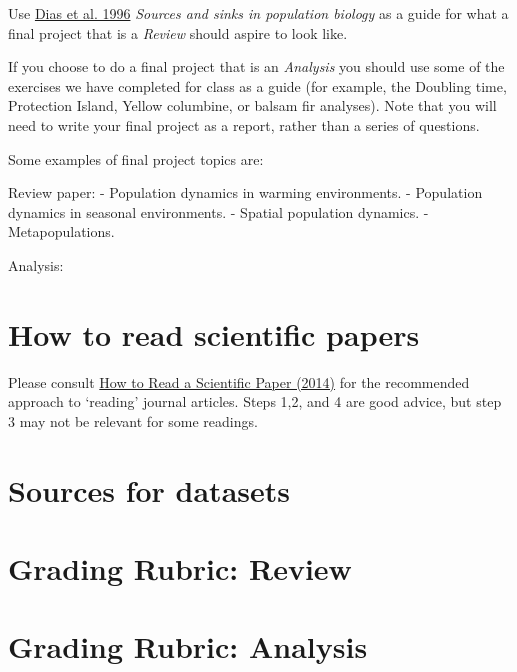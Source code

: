 \documentclass[]{book}
\begin{document}
Use
\href{https://www-sciencedirect-com.qe2a-proxy.mun.ca/science/article/pii/0169534796100379?via\%3Dihub}{Dias
et al. 1996} \emph{Sources and sinks in population biology} as a guide
for what a final project that is a \emph{Review} should aspire to look
like.

If you choose to do a final project that is an \emph{Analysis} you
should use some of the exercises we have completed for class as a guide
(for example, the Doubling time, Protection Island, Yellow columbine, or
balsam fir analyses). Note that you will need to write your final
project as a report, rather than a series of questions.

Some examples of final project topics are:

Review paper: - Population dynamics in warming environments. -
Population dynamics in seasonal environments. - Spatial population
dynamics. - Metapopulations.

Analysis:

\section{How to read scientific
papers}\label{how-to-read-scientific-papers}

Please consult
\href{https://www.research4life.org/blog/how-to-read-a-scientific-paper/}{How
to Read a Scientific Paper (2014)} for the recommended approach to
`reading' journal articles. Steps 1,2, and 4 are good advice, but step 3
may not be relevant for some readings.

\section{Sources for datasets}\label{sources-for-datasets}

\section{Grading Rubric: Review}\label{grading-rubric-review}

\section{Grading Rubric: Analysis}\label{grading-rubric-analysis}

\backmatter
\end{document}
